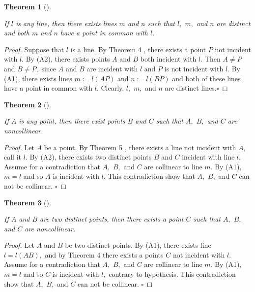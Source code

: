 \documentclass[
  twoside,
  12pt,
  letterpaper,
  fleqn]{article}
\theoremstyle{definition}
\theoremstyle{definition}
\theoremstyle{plain}
\theoremstyle{plain}
\newtheorem{theorem}{Theorem}[section]
\theoremstyle{remark}
\begin{document}
\begin{theorem}[]\protect\hypertarget{thm-nine}{}\label{thm-nine}

If \(l\) is any line, then there exists lines \(m\) and \(n\) such that
\(l,\) \(m,\) and \(n\) are distinct and both \(m\) and \(n\) have a
point in common with \(l.\)

\end{theorem}

\begin{proof}

Suppose that \(l\) is a line. By Theorem 4 , there exists a point \(P\)
not incident with \(l.\) By (A2), there exists points \(A\) and \(B\)
both incident with \(l.\) Then \(A\neq P\) and \(B\neq P,\) since \(A\)
and \(B\) are incident with \(l\) and \(P\) is not incident with \(l.\)
By (A1), there exists lines \(m:=l(AP)\) and \(n:=l(BP)\) and both of
these lines have a point in common with \(l.\) Clearly, \(l,\) \(m,\)
and \(n\) are distinct lines.\(\square\)

\end{proof}

\begin{theorem}[]\protect\hypertarget{thm-ten}{}\label{thm-ten}

If \(A\) is any point, then there exist points \(B\) and \(C\) such that
\(A,\) \(B,\) and \(C\) are noncollinear.

\end{theorem}

\begin{proof}

Let \(A\) be a point. By Theorem 5 , there exists a line not incident
with \(A,\) call it \(l.\) By (A2), there exists two distinct points
\(B\) and \(C\) incident with line \(l.\) Assume for a contradiction
that \(A,\) \(B,\) and \(C\) are collinear to line \(m.\) By (A1),
\(m=l\) and so \(A\) is incident with \(l.\) This contradiction show
that \(A,\) \(B,\) and \(C\) can not be collinear. \(\square\)

\end{proof}

\begin{theorem}[]\protect\hypertarget{thm-eleven}{}\label{thm-eleven}

If \(A\) and \(B\) are two distinct points, then there exists a point
\(C\) such that \(A,\) \(B,\) and \(C\) are noncollinear.

\end{theorem}

\begin{proof}

Let \(A\) and \(B\) be two distinct points. By (A1), there exists line
\(l=l(AB),\) and by Theorem 4 there exists a points \(C\) not incident
with \(l.\) Assume for a contradiction that \(A,\) \(B,\) and \(C\) are
collinear to line \(m.\) By (A1), \(m=l\) and so \(C\) is incident with
\(l,\) contrary to hypothesis. This contradiction show that \(A,\)
\(B,\) and \(C\) can not be collinear. \(\square\)

\end{proof}
\end{document}
